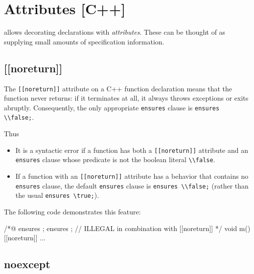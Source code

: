 \section{Attributes [C++]}
\label{sec:attributes}

\experimental

\lang allows decorating declarations with \textit{attributes}.
These can be thought of as supplying small amounts of specification information.

\subsection{[[noreturn]]}
\label{sec:noreturn}

The \lstinline|[[noreturn]]| attribute on a C++ function declaration means
that the function never returns: if it terminates at all, it always throws
exceptions or exits abruptly. Consequently, the only appropriate \lstinline|ensures| clause
is \lstinline|ensures \\false;|.

Thus
\begin{itemize}
\item It is a syntactic error if a function has both a \lstinline|[[noreturn]]|
attribute and an \lstinline|ensures| clause whose predicate is not the
boolean literal \lstinline|\\false|.
\item If a function with an \lstinline|[[noreturn]]| attribute has a behavior
that contains no \lstinline|ensures| clause, the default \lstinline|ensures|
clause is \lstinline|ensures \\false;| (rather than the usual \lstinline|ensures \true;|).
\end{itemize}

\begin{example} The following code demonstrates this feature:
\begin{listing-nonumber}
/*@
ensures \false;
ensures \true; // ILLEGAL in combination with [[noreturn]]
*/
void m() [[noreturn]] { ... }
\end{listing-nonumber}
\end{example}


\subsection{noexcept}
\label{sec:noexcept}

